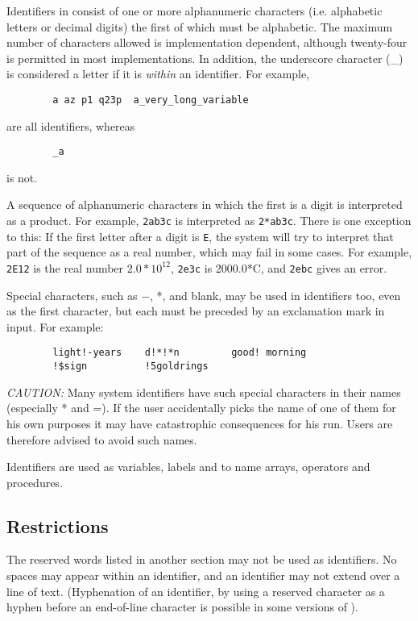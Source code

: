 Identifiers in {\REDUCE} consist of one or more
alphanumeric characters (i.e. alphabetic letters or decimal
digits) the first of which must be alphabetic.  The maximum number of
characters allowed is implementation dependent, although twenty-four is
permitted in most implementations.  In addition, the underscore character
(\_) is considered a letter if it is {\it within} an identifier.  For example,
\begin{verbatim}
        a az p1 q23p  a_very_long_variable
\end{verbatim}
are all identifiers, whereas
\begin{verbatim}
        _a
\end{verbatim}
is not.

A sequence of alphanumeric characters in which the first is a digit is
interpreted as a product.  For example, {\tt 2ab3c} is interpreted as
{\tt 2*ab3c}.  There is one exception to this:  If the first letter after a
digit is {\tt E}, the system will try to interpret that part of the
sequence as a real number, which may fail in some cases.  For
example, {\tt 2E12} is the real number $2.0*10^{12}$, {\tt 2e3c} is
2000.0*C, and {\tt 2ebc} gives an error.

Special characters, such as $-$, *, and blank, may be used in identifiers
too, even as the first character, but each must be preceded by an
exclamation mark in input.  For example:
\begin{verbatim}
        light!-years    d!*!*n         good! morning
        !$sign          !5goldrings
\end{verbatim}
{\it CAUTION:} Many system identifiers have such special characters in their
names (especially * and =). If the user accidentally picks the name of one
of them for his own purposes it may have catastrophic consequences for his
{\REDUCE} run.  Users are therefore advised to avoid such names.

Identifiers are used as variables, labels and to name arrays, operators
and procedures.

\subsection*{Restrictions}

The reserved words listed in another section may not be used as
identifiers.  No spaces may appear within an identifier, and an identifier
may not extend over a line of text. (Hyphenation of an identifier, by
using a reserved character as a hyphen before an end-of-line character is
possible in some versions of {\REDUCE}).

